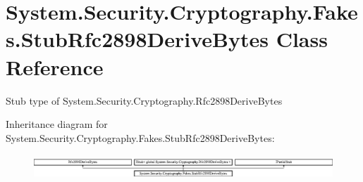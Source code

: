\hypertarget{class_system_1_1_security_1_1_cryptography_1_1_fakes_1_1_stub_rfc2898_derive_bytes}{\section{System.\-Security.\-Cryptography.\-Fakes.\-Stub\-Rfc2898\-Derive\-Bytes Class Reference}
\label{class_system_1_1_security_1_1_cryptography_1_1_fakes_1_1_stub_rfc2898_derive_bytes}
}


Stub type of System.\-Security.\-Cryptography.\-Rfc2898\-Derive\-Bytes 


Inheritance diagram for System.\-Security.\-Cryptography.\-Fakes.\-Stub\-Rfc2898\-Derive\-Bytes\-:\begin{figure}[H]
\begin{center}
\leavevmode
\includegraphics[height=0.926385cm]{class_system_1_1_security_1_1_cryptography_1_1_fakes_1_1_stub_rfc2898_derive_bytes}
\end{center}
\end{figure}
